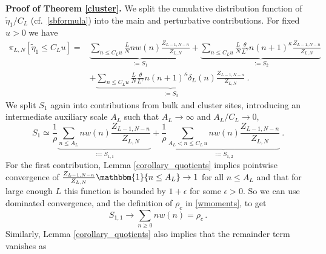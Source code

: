\documentclass[pdflatex,sn-mathphys-num]{sn-jnl}%
\theoremstyle{thmstyleone}%
\theoremstyle{thmstyletwo}%
\theoremstyle{thmstylethree}%
\begin{document}
\noindent\textbf{Proof of Theorem \ref{cluster}.} 
We split the cumulative distribution function of $\tilde{\eta}_1/C_L$ (cf.\ \eqref{sbformula}) into the main and perturbative contributions. For fixed $u > 0$ we have
\begin{align*}
\pi_{L,N}\left[\tilde{\eta}_1 \leq C_L u\right]  =&\underbrace{\sum_{n \leq C_L u} \frac{L}{N} n w(n) \frac{Z_{L-1,N-n}}{Z_{L,N}}}_{:=S_1} +\underbrace{\sum_{n \leq C_L u} \frac{L}{N} \frac{\theta}{L^\gamma} n(n+1)^\kappa \frac{Z_{L-1,N-n}}{Z_{L,N}}}_{:=S_2}\\
&+\underbrace{\sum_{n \leq C_L u} \frac{L}{N} \frac{\theta}{L^\gamma} n(n+1)^\kappa \delta_L (n) \frac{Z_{L-1,N-n}}{Z_{L,N}}}_{:=S_3} \ .
\end{align*}
We split $S_1$ again into contributions from bulk and cluster sites, introducing an intermediate auxiliary scale $A_L$ such that $A_L \to \infty$ and $A_L/C_L \to 0$,
\begin{equation}\label{split}
S_1 \simeq \frac{1}{\rho} \underbrace{\sum_{n \leq A_L} n w(n) \frac{Z_{L-1,N-n}}{Z_{L,N}}}_{:=S_{1,1}} + \frac{1}{\rho} \underbrace{\sum_{A_L < n \leq C_L\,u} n w(n) \frac{Z_{L-1,N-n}}{Z_{L,N}}}_{:=S_{1,2}}\ .
\end{equation}
For the first contribution, Lemma \ref{corollary_quotients} implies pointwise convergence of $\frac{Z_{L-1,N-n}}{Z_{L,N}} \mathbbm{1}\{ n\leq A_L\}\to 1$ for all $n\leq A_L$ and that for large enough $L$ this function is bounded by $1+\epsilon$ for some $\epsilon >0$. So we can use dominated convergence, and the definition of $\rho_c$ in \eqref{wmoments}, to get
\[
S_{1,1} \to\sum_{n\geq 0} n w(n) =\rho_c \,.
\]
Similarly, Lemma \ref{corollary_quotients} also implies that the remainder term vanishes as
\end{document}
